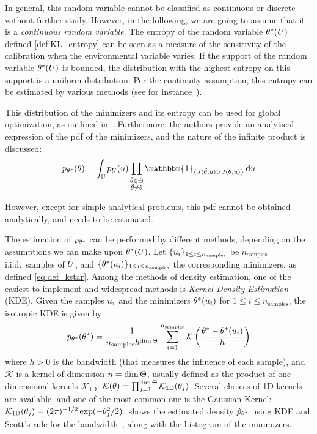 \documentclass[../../Main_ManuscritThese.tex]{subfiles}
\begin{document}
In general, this random variable cannot be classified as continuous or discrete without further study. However, in the following, we are going to assume that it is a \emph{continuous random variable}.
The entropy of the random variable $\theta^*(U)$ defined \cref{def:KL_entropy} can be seen as a measure of the sensitivity of the calibration when the environmental variable varies. If the support of the random variable $\theta^*(U)$ is bounded, the distribution with the highest entropy on this support is a uniform distribution. 
Per the continuity assumption, this entropy can be estimated by various methods (see for instance~\cite{beirlant_nonparametric_1997}).


This distribution of the minimizers and its entropy can be used for global optimization, as outlined in~\cite{hennig_entropy_2011}. Furthermore, the authors provide an analytical expression of the pdf of the minimizers, and the nature of the infinite product is discussed:
\begin{equation}
  p_{\KK^*}(\kk) = \int_{\Uspace} p_{\UU}(\uu)\prod_{\substack{\tilde{\kk}\in \Kspace\\\tilde{\kk}\neq \kk}} \mathbbm{1}_{\{J(\tilde{\kk},\uu) > J(\kk, \uu)\}}\,\mathrm{d}\uu
\end{equation}

However, except for simple analytical problems, this pdf cannot be obtained analytically, and needs to be estimated.

The estimation of $p_{\theta^*}$ can be performed by different methods, depending on the assumptions we can make upon $\theta^*(U)$. Let $\{u_i\}_{1\leq i \leq n_{\mathrm{samples}}}$ be $n_{\mathrm{samples}}$ i.i.d.\ samples of $U$, and $\{\theta^*(u_i)\}_{1\leq i \leq n_{\mathrm{samples}}}$ the corresponding minimizers, as defined \cref{eq:def_kstar}. Among the methods of density estimation, one of the easiest to implement and widespread methods is \emph{Kernel Density Estimation} (KDE). 
Given the samples $u_i$  and the minimizers $\theta^*(u_i)$ for $1\leq i \leq n_{\mathrm{samples}}$, the isotropic KDE is given by
\begin{equation}
  \hat{p}_{\theta^*}(\theta^*) = \frac{1}{n_{\mathrm{samples}} h^{\dim \Theta}} \sum_{i=1}^{n_{\mathrm{samples}}} \mathcal{K}\left(\frac{\theta^* - \theta^*(u_i)}{h}\right)
\end{equation}
where $h>0$ is the bandwidth (that measures the influence of each sample), and $\mathcal{K}$ is a kernel of dimension $n=\dim \Theta$, usually defined as the product of one-dimensional kernels $\mathcal{K}_{1\mathrm{D}}$: $\mathcal{K}(\theta) = \prod_{j=1}^{\dim \Theta}\mathcal{K}_{1\mathrm{D}}(\theta_j)$. Several choices of 1D kernels are available, and one of the most common one is the Gaussian Kernel: $\mathcal{K}_{1\mathrm{D}}(\theta_j) = (2\pi)^{-1/2}\exp(-\theta_j^2 /2)$.  shows the estimated density $\hat{p}_{\theta^*}$ using KDE and Scott's rule for the bandwidth~\cite{scott_optimal_1979}, along with the histogram of the minimizers.
\end{document}
